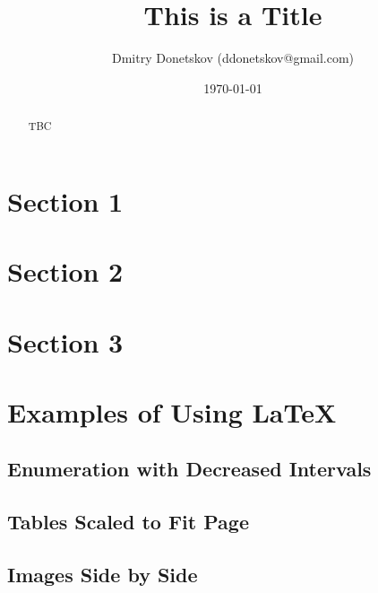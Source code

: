 \documentclass[a4paper,11pt]{article}
\title{\vspace{-1.5cm}This is a Title}
\author{Dmitry Donetskov (ddonetskov@gmail.com)}
\date{\today}
\begin{document}
\maketitle

\begin{abstract}

TBC

\end{abstract}

\section{Section 1}

\section{Section 2}

\section{Section 3}

\appendix

\section{Examples of Using \LaTeX}

\subsection{Enumeration with Decreased Intervals}

\subsection{Tables Scaled to Fit Page}

\subsection{Images Side by Side}

\end{document}
